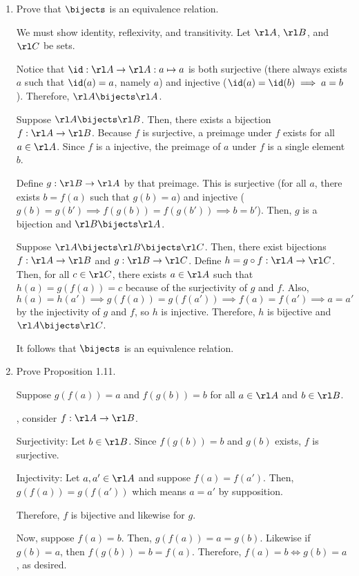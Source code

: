 \documentclass[class=math239,notes]{agony}
\begin{document}
\begin{xca}\end{xca}
\begin{enumerate}
  \item Prove that $\bijects$ is an equivalence relation.
        \begin{prf}
          We must show identity, reflexivity, and transitivity.
          Let $\rl A$, $\rl B$, and $\rl C$ be sets.

          Notice that $\id : \rl A \to \rl A : a \mapsto a$
          is both surjective (there always exists $a$ such that $\id(a) = a$, namely $a$)
          and injective ($\id(a) = \id(b) \implies a = b$).
          Therefore, $\rl A \bijects \rl A$.

          Suppose $\rl A \bijects \rl B$.
          Then, there exists a bijection $f : \rl A \to \rl B$.
          Because $f$ is surjective, a preimage under $f$ exists for all $a \in \rl A$.
          Since $f$ is a injective, the preimage of $a$ under $f$ is a single element $b$.

          Define $g : \rl B \to \rl A$ by that preimage.
          This is surjective (for all $a$, there exists $b = f(a)$ such that $g(b) = a$)
          and injective ($g(b) = g(b') \implies f(g(b)) = f(g(b')) \implies b = b'$).
          Then, $g$ is a bijection and $\rl B \bijects \rl A$.

          Suppose $\rl A \bijects \rl B \bijects \rl C$.
          Then, there exist bijections $f : \rl A \to \rl B$ and $g : \rl B \to \rl C$.
          Define $h = g \circ f : \rl A \to \rl C$.
          Then, for all $c \in \rl C$, there exists $a \in \rl A$
          such that $h(a) = g(f(a)) = c$ because of the surjectivity of $g$ and $f$.
          Also, $h(a) = h(a') \implies g(f(a)) = g(f(a')) \implies f(a) = f(a') \implies a = a'$
          by the injectivity of $g$ and $f$, so $h$ is injective.
          Therefore, $h$ is bijective and $\rl A \bijects \rl C$.

          It follows that $\bijects$ is an equivalence relation.
        \end{prf}
  \item Prove Proposition 1.11.
        \begin{prf}
          Suppose $g(f(a)) = a$ and $f(g(b)) = b$ for all $a \in \rl A$ and $b \in \rl B$.

          \WLOG, consider $f : \rl A \to \rl B$.

          Surjectivity: Let $b \in \rl B$.
          Since $f(g(b)) = b$ and $g(b)$ exists, $f$ is surjective.

          Injectivity: Let $a, a' \in \rl A$ and suppose $f(a) = f(a')$.
          Then, $g(f(a)) = g(f(a'))$ which means $a = a'$ by supposition.

          Therefore, $f$ is bijective and likewise for $g$.

          Now, suppose $f(a) = b$. Then, $g(f(a)) = a = g(b)$.
          Likewise if $g(b) = a$, then $f(g(b)) = b = f(a)$.
          Therefore, $f(a) = b \iff g(b) = a$, as desired.
        \end{prf}
\end{enumerate}
\end{document}
